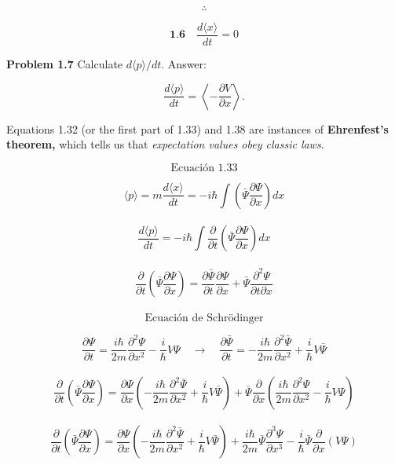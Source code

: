 \documentclass[10pt,a4papper]{article}
\begin{document}
\[\therefore\]

\[\boxed{\textbf{1.6}\quad\frac{d\langle x\rangle}{dt}=0}\]

\newpage
\textbf{Problem 1.7} Calculate $d\langle p\rangle/dt$. Answer:

\[\frac{d\langle p\rangle}{dt}=\left\langle-\frac{\partial V}{\partial x}\right\rangle.\]

Equations 1.32 (or the first part of 1.33) and 1.38 are instances of \textbf{Ehrenfest's
  theorem,} which tells us that \emph{expectation values obey classic laws}.

\newpage
\[\text{Ecuación 1.33}\]

\[\langle p\rangle=m\frac{d\langle x\rangle}{dt}=-i\hbar\int\left(\bar\Psi\frac{\partial\Psi}{\partial x}\right)dx\]\\

\[\frac{d\langle p\rangle}{dt}=-i\hbar\int\frac{\partial}{\partial t}\left(\bar\Psi\frac{\partial\Psi}{\partial x}\right)dx\]\\

\[\frac{\partial}{\partial t}\left(\bar\Psi\frac{\partial\Psi}{\partial x}\right)=
\frac{\partial\bar\Psi}{\partial t}\frac{\partial\Psi}{\partial x}+\bar\Psi\frac{\partial^2\Psi}{\partial t\partial x}\]\\

\[\text{Ecuación de Schrödinger}\]

\[\frac{\partial\Psi}{\partial t}=\frac{i\hbar}{2m}\frac{\partial^2\Psi}{\partial x^2}-\frac{i}{\hbar}V\Psi\quad\to\quad
\frac{\partial\bar\Psi}{\partial t}=-\frac{i\hbar}{2m}\frac{\partial^2\bar\Psi}{\partial x^2}+\frac{i}{\hbar}V\bar\Psi\]\\

\[\frac{\partial}{\partial t}\left(\bar\Psi\frac{\partial\Psi}{\partial x}\right)=
\frac{\partial\Psi}{\partial x}\left(-\frac{i\hbar}{2m}\frac{\partial^2\bar\Psi}{\partial x^2}+\frac{i}{\hbar}V\bar\Psi\right)
+\bar\Psi\frac{\partial}{\partial x}\left(\frac{i\hbar}{2m}\frac{\partial^2\Psi}{\partial x^2}-\frac{i}{\hbar}V\Psi\right)\]\\

\[\frac{\partial}{\partial t}\left(\bar\Psi\frac{\partial\Psi}{\partial x}\right)=
\frac{\partial\Psi}{\partial x}\left(-\frac{i\hbar}{2m}\frac{\partial^2\bar\Psi}{\partial x^2}+\frac{i}{\hbar}V\bar\Psi\right)
+\frac{i\hbar}{2m}\bar\Psi\frac{\partial^3\Psi}{\partial x^3}-\frac{i}{\hbar}\bar\Psi\frac{\partial}{\partial x}(V\Psi)\]\\
\end{document}
